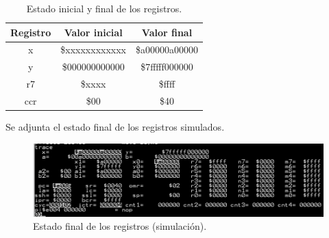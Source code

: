 \begin{table}[H]
\centering
\begin{tabular}{|c|c|c|}
\hline
\textbf{Registro} & \textbf{Valor inicial} & \textbf{Valor final} \\ \hline
x                 & \$xxxxxxxxxxxx         & \$a00000a00000       \\ \hline
y                 & \$000000000000         & \$7fffff000000       \\ \hline
r7                & \$xxxx                 & \$ffff               \\ \hline
ccr               & \$00                   & \$40                 \\ \hline
\end{tabular}
\caption{Estado inicial y final de los registros.}
\label{tab:ej3_results}
\end{table}

Se adjunta el estado final de los registros simulados.

\begin{figure}[H]
    \centering
    \includegraphics[width=\textwidth]{figs/ej3/3_4.png}
    \caption{Estado final de los registros (simulación).}
    \label{fig:ej3_simregs}
\end{figure}

